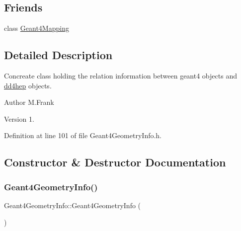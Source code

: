 \subsection*{Friends}
\begin{DoxyCompactItemize}
\item 
class \hyperlink{class_d_d4hep_1_1_simulation_1_1_geant4_geometry_info_a1fe4b6e068c20a04fa1a7226219dac7c}{Geant4\+Mapping}
\end{DoxyCompactItemize}


\subsection{Detailed Description}
Concreate class holding the relation information between geant4 objects and \hyperlink{namespacedd4hep}{dd4hep} objects. 

\begin{DoxyAuthor}{Author}
M.\+Frank 
\end{DoxyAuthor}
\begin{DoxyVersion}{Version}
1. 
\end{DoxyVersion}


Definition at line 101 of file Geant4\+Geometry\+Info.\+h.



\subsection{Constructor \& Destructor Documentation}
\hypertarget{class_d_d4hep_1_1_simulation_1_1_geant4_geometry_info_a1da4666f8da102d02b986becb980dcb9}{}\label{class_d_d4hep_1_1_simulation_1_1_geant4_geometry_info_a1da4666f8da102d02b986becb980dcb9} 
\subsubsection{\texorpdfstring{Geant4\+Geometry\+Info()}{Geant4GeometryInfo()}}
{\footnotesize\ttfamily Geant4\+Geometry\+Info\+::\+Geant4\+Geometry\+Info (\begin{DoxyParamCaption}{ }\end{DoxyParamCaption})\hspace{0.3cm}{\ttfamily [private]}}



